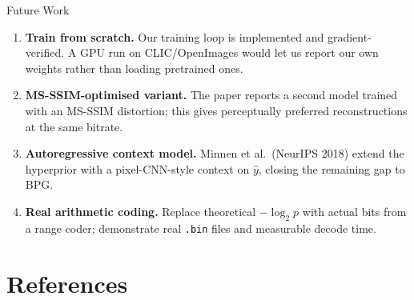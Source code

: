 \documentclass[aspectratio=169, 12pt]{beamer}
\begin{document}
\begin{frame}{Future Work}
    \begin{enumerate}
        \setlength\itemsep{0.9em}
        \item \textbf{Train from scratch.} Our training loop is implemented and gradient-verified. A GPU run on CLIC/OpenImages would let us report our own weights rather than loading pretrained ones.
        \item \textbf{MS-SSIM-optimised variant.} The paper reports a second model trained with an MS-SSIM distortion; this gives perceptually preferred reconstructions at the same bitrate.
        \item \textbf{Autoregressive context model.} Minnen et al.\ (NeurIPS 2018) extend the hyperprior with a pixel-CNN-style context on $\hat y$, closing the remaining gap to BPG.
        \item \textbf{Real arithmetic coding.} Replace theoretical $-\log_2 p$ with actual bits from a range coder; demonstrate real \texttt{.bin} files and measurable decode time.
    \end{enumerate}
\end{frame}

\section*{References}
\end{document}
